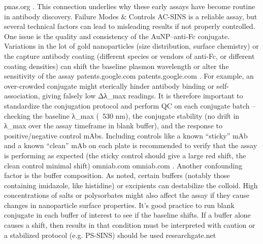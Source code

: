 pnas.org
. This connection underlies why these early assays have become routine in antibody discovery.
Failure Modes & Controls
AC-SINS is a reliable assay, but several technical factors can lead to misleading results if not properly controlled. One issue is the quality and consistency of the AuNP–anti-Fc conjugate. Variations in the lot of gold nanoparticles (size distribution, surface chemistry) or the capture antibody coating (different species or vendors of anti-Fc, or different coating densities) can shift the baseline plasmon wavelength or alter the sensitivity of the assay
patents.google.com
patents.google.com
. For example, an over-crowded conjugate might sterically hinder antibody binding or self-association, giving falsely low Δλ_max readings. It is therefore important to standardize the conjugation protocol and perform QC on each conjugate batch – checking the baseline λ_max (~530 nm), the conjugate stability (no drift in λ_max over the assay timeframe in blank buffer), and the response to positive/negative control mAbs. Including controls like a known “sticky” mAb and a known “clean” mAb on each plate is recommended to verify that the assay is performing as expected (the sticky control should give a large red shift, the clean control minimal shift)
omniab.com
omniab.com
. Another confounding factor is the buffer composition. As noted, certain buffers (notably those containing imidazole, like histidine) or excipients can destabilize the colloid. High concentrations of salts or polysorbates might also affect the assay if they cause changes in nanoparticle surface properties. It’s good practice to run blank conjugate in each buffer of interest to see if the baseline shifts. If a buffer alone causes a shift, then results in that condition must be interpreted with caution or a stabilized protocol (e.g. PS-SINS) should be used
researchgate.net
